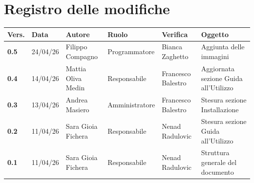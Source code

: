 \documentclass[a4paper,12pt]{article}
\begin{document}
    

    \section*{Registro delle modifiche} {
        \begin{table}[h!]
                \begin{tabularx}{\textwidth}{|l|l|l|l|L|L|}
                \hline
                \textbf{Vers.} & \textbf{Data} & \textbf{Autore} & \textbf{Ruolo} & \textbf{Verifica} & \textbf{Oggetto} \\
                \hline
                \textbf{0.5} & 24/04/26 & Filippo Compagno & Programmatore & Bianca Zaghetto & Aggiunta delle immagini\\
                \hline
                \textbf{0.4} & 14/04/26 & Mattia Oliva Medin & Responsabile & Francesco Balestro & Aggiornata sezione Guida all'Utilizzo\\
                \hline
                \textbf{0.3} & 13/04/26 & Andrea Masiero & Amministratore & Francesco Balestro & Stesura sezione Installazione\\
                \hline
                \textbf{0.2} & 11/04/26 & Sara Gioia Fichera & Responsabile & Nenad Radulovic & Stesura sezione Guida all'Utilizzo\\
                \hline
                \textbf{0.1} & 11/04/26 & Sara Gioia Fichera & Responsabile & Nenad Radulovic & Struttura generale del documento\\
                \hline
            \end{tabularx}
        \end{table}
    }
    \newpage
    
    \tableofcontents
    \newpage

    \listoffigures
    \newpage
    
\end{document}
